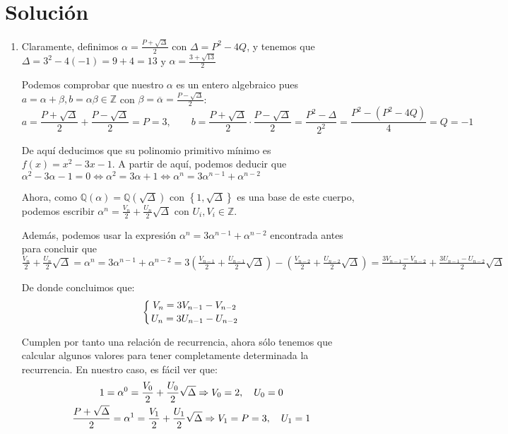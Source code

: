 \section*{Solución}
   \begin{enumerate}
        \item Claramente, definimos $\displaystyle \alpha = \frac{P + \sqrt{\Delta}}{2}$ con $\Delta = P^2 - 4Q$,
        y tenemos que $\Delta = 3^2 - 4(-1) = 9+4 = 13$ y $\displaystyle \alpha = \frac{3 + \sqrt{13}}{2}$
        
        Podemos comprobar que nuestro $\alpha$ es un entero algebraico pues $a = \alpha + \beta, b = \alpha
        \beta \in \mathbb{Z}$ con $\displaystyle \beta = \overline{\alpha} = \frac{P - \sqrt{\Delta}}{2}$:
        $$\displaystyle a = \frac{P + \sqrt{\Delta}}{2} + \frac{P - \sqrt{\Delta}}{2} = P = 3, \qquad
        b = \frac{P + \sqrt{\Delta}}{2} \cdot \frac{P - \sqrt{\Delta}}{2} = \frac{P^2-\Delta}{2^2} =
        \frac{P^2-(P^2-4Q)}{4} = Q = -1$$
        
        De aquí deducimos que su polinomio primitivo mínimo es $f(x) = x^2 -3x -1$. A partir de aquí, podemos
        deducir que $\alpha^2 -3\alpha -1 = 0 \Leftrightarrow \alpha^2  = 3\alpha +1 \Leftrightarrow \alpha^n  =
        3\alpha^{n-1} + \alpha^{n-2}$
        
        Ahora, como $\mathbb{Q\left(\alpha\right)} = \mathbb{Q\left(\sqrt{\Delta}\right)}$ con $\left\lbrace1,
        \sqrt{\Delta}\right\rbrace$ es una base de este cuerpo, podemos escribir $\displaystyle \alpha^n =
        \frac{V_n}{2} + \frac{U_n}{2}\sqrt{\Delta}$ con $U_i, V_i \in \mathbb{Z}$.
        
        Además, podemos usar la expresión $\alpha^n  = 3\alpha^{n-1} + \alpha^{n-2}$ encontrada antes para
        concluir que $\displaystyle \frac{V_n}{2} + \frac{U_n}{2}\sqrt{\Delta} = \alpha^n  = 3\alpha^{n-1} +
        \alpha^{n-2} = 3\left(\frac{V_{n-1}}{2} + \frac{U_{n-1}}{2}\sqrt{\Delta}\right) -\left(\frac{V_{n-2}}{2} +
        \frac{U_{n-2}}{2}\sqrt{\Delta}\right) = \frac{3V_{n-1}-V_{n-2}}{2} + \frac{3U_{n-1}-U_{n-2}}{2}\sqrt{\Delta}$

        De donde concluimos que:
        $$\left\lbrace
   			V_n = 3V_{n-1}-V_{n-2} \atop
   			U_n = 3U_{n-1}-U_{n-2}
   		\right.$$
   		
   		Cumplen por tanto una relación de recurrencia, ahora sólo tenemos que calcular algunos valores para tener
   		completamente determinada la recurrencia. En nuestro caso, es fácil ver que:
		$$\left.
   			\displaystyle 1 = \alpha^0 = \frac{V_0}{2} + \frac{U_0}{2}\sqrt{\Delta} \Rightarrow V_0 = 2, \quad U_0 = 0 \atop
   			\displaystyle \frac{P + \sqrt{\Delta}}{2} = \alpha^1 = \frac{V_1}{2} + \frac{U_1}{2}\sqrt{\Delta}\Rightarrow V_1 = P = 3, \quad U_1 = 1 
   		\right.$$
   		

\end{enumerate}
